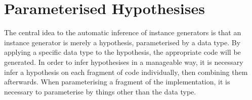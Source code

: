 \documentclass{llncs}
\begin{document}
\begin{comment}
To write an instance generator for DrIFT requires the implementation of a function, which takes a representation of a data type, and generates Haskell code. The code must be generated using special functions to ensure it has the correct layout. The author of an instance generator must be familiar with both the representation of the data structure, and with the code-generation functions.

\subsection{The Derive tool}

The Derive tool \cite{derive} is a competitor to DrIFT, designed to alleviate some of the disadvantages. The first advantage is that instance generators can added easily, without modifying the Derive tool. Secondly, by using the Template Haskell \cite{template_haskell} extension, no preprocessing phase is required. In order to integrate with Template Haskell, an instance generator takes a representation of a data type, and generates a Haskell syntax tree.

Writing an instance generator requires knowledge of the representation of both the data type, and the Haskell syntax tree. Unfortunately, the Haskell syntax tree is represented by a large data type, which takes time to learn. After writing an instance generator, the user must check that the generator matches their intention, by testing on a suitable range of data types. Both of these factors increase the time required to write an instance generator.

We have integrated automatic derivation of an instance generator, following the scheme in this paper, into the Derive tool. In order to specify a new instance generator, the user can \textit{either} specify a derivation function, \textit{or} have one automatically generated from an example.
\end{comment}

\section{Parameterised Hypothesises}

The central idea to the automatic inference of instance generators is that an instance generator is merely a hypothesis, parameterised by a data type. By applying a specific data type to the hypothesis, the appropriate code will be generated. In order to infer hypothesises in a manageable way, it is necessary infer a hypothesis on each fragment of code individually, then combining them afterwards. When parameterising a fragment of the implementation, it is necessary to parameterise by things other than the data type.
\end{document}
